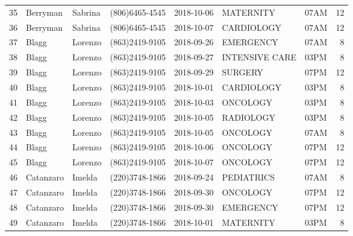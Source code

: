 \documentclass[11pt]{article}
\begin{document}
\begin{tabular}{|l|l|l|l|l|l|l|r|}
	35 &   Berryman &  Sabrina &  (806)6465-4545 &  2018-10-06 &       MATERNITY &  07AM &            12 \\
	36 &   Berryman &  Sabrina &  (806)6465-4545 &  2018-10-07 &      CARDIOLOGY &  07AM &            12 \\
	37 &      Blagg &  Lorenzo &  (863)2419-9105 &  2018-09-26 &       EMERGENCY &  07AM &             8 \\
	38 &      Blagg &  Lorenzo &  (863)2419-9105 &  2018-09-27 &  INTENSIVE CARE &  03PM &             8 \\
	39 &      Blagg &  Lorenzo &  (863)2419-9105 &  2018-09-29 &         SURGERY &  07PM &            12 \\
	40 &      Blagg &  Lorenzo &  (863)2419-9105 &  2018-10-01 &      CARDIOLOGY &  03PM &             8 \\
	41 &      Blagg &  Lorenzo &  (863)2419-9105 &  2018-10-03 &        ONCOLOGY &  03PM &             8 \\
	42 &      Blagg &  Lorenzo &  (863)2419-9105 &  2018-10-05 &       RADIOLOGY &  03PM &             8 \\
	43 &      Blagg &  Lorenzo &  (863)2419-9105 &  2018-10-05 &        ONCOLOGY &  07AM &             8 \\
	44 &      Blagg &  Lorenzo &  (863)2419-9105 &  2018-10-06 &        ONCOLOGY &  07PM &            12 \\
	45 &      Blagg &  Lorenzo &  (863)2419-9105 &  2018-10-07 &        ONCOLOGY &  07PM &            12 \\
	46 &  Catanzaro &   Imelda &  (220)3748-1866 &  2018-09-24 &      PEDIATRICS &  07AM &             8 \\
	47 &  Catanzaro &   Imelda &  (220)3748-1866 &  2018-09-30 &        ONCOLOGY &  07PM &            12 \\
	48 &  Catanzaro &   Imelda &  (220)3748-1866 &  2018-09-30 &       EMERGENCY &  07PM &            12 \\
	49 &  Catanzaro &   Imelda &  (220)3748-1866 &  2018-10-01 &       MATERNITY &  03PM &             8 \\
	\bottomrule
\end{tabular}


    
    
    
    
\end{document}
